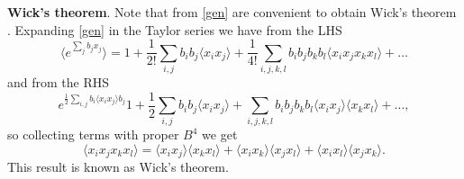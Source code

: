 

\textbf{Wick's theorem}. Note that from \eqref{gen} are convenient to obtain Wick’s theorem . Expanding \eqref{gen} in the Taylor series we have from the LHS
\begin{equation*}
	\langle e^{\sum_j b_j x_j}\rangle = 1 + \frac{1}{2!} \sum_{i,j} b_i b_j \langle x_i x_j\rangle + \frac{1}{4!}  \sum_{i,j,k,l} b_i b_j b_k b_l \langle x_i x_j x_k x_l\rangle + \ldots
\end{equation*}
and from the RHS 
\begin{equation*}
	e^{\frac{1}{2}\sum_{i,j} b_i \langle x_i x_j \rangle b_j} 1 + \frac{1}{2} \sum_{i,j} b_i b_j \langle x_i x_j\rangle + \sum_{i,j,k,l} b_i b_j b_k b_l \langle x_i x_j\rangle \langle x_k x_l\rangle + \ldots,
\end{equation*}
so collecting terms with proper $B^4$ we get
\begin{equation*}
	\langle x_i x_j x_k x_l\rangle = \langle x_i x_j\rangle \langle x_k x_l\rangle + \langle x_i x_k\rangle \langle x_j x_l\rangle + \langle x_i x_l\rangle \langle x_j x_k\rangle.
\end{equation*}
This result is known as Wick's theorem.